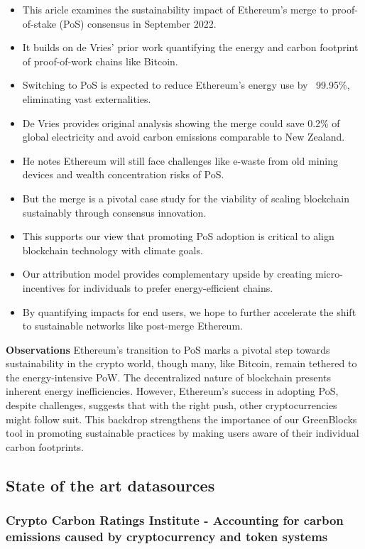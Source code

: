 \documentclass{article}
\begin{document}
\begin{itemize}
    \item This aricle examines the sustainability impact of Ethereum's merge to proof-of-stake (PoS) consensus in September 2022.
    \item It builds on de Vries' prior work quantifying the energy and carbon footprint of proof-of-work chains like Bitcoin.
    \item Switching to PoS is expected to reduce Ethereum's energy use by ~99.95\%, eliminating vast externalities.
    \item De Vries provides original analysis showing the merge could save 0.2\% of global electricity and avoid carbon emissions comparable to New Zealand.
    \item He notes Ethereum will still face challenges like e-waste from old mining devices and wealth concentration risks of PoS.
    \item But the merge is a pivotal case study for the viability of scaling blockchain sustainably through consensus innovation.
    \item This supports our view that promoting PoS adoption is critical to align blockchain technology with climate goals.
    \item Our attribution model provides complementary upside by creating micro-incentives for individuals to prefer energy-efficient chains.
    \item By quantifying impacts for end users, we hope to further accelerate the shift to sustainable networks like post-merge Ethereum.
\end{itemize}

\textbf{Observations}
Ethereum's transition to PoS marks a pivotal step towards sustainability in the crypto world, though many, like Bitcoin, remain tethered to the energy-intensive PoW. The decentralized nature of blockchain presents inherent energy inefficiencies. However, Ethereum's success in adopting PoS, despite challenges, suggests that with the right push, other cryptocurrencies might follow suit. This backdrop strengthens the importance of our GreenBlocks tool in promoting sustainable practices by making users aware of their individual carbon footprints.


\subsection{State of the art datasources}

\subsubsection{Crypto Carbon Ratings Institute - Accounting for carbon emissions caused by
    cryptocurrency and token systems}
\end{document}
